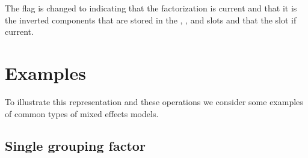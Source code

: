 \documentclass[12pt]{article}
\begin{document}
The  flag is changed to  indicating
that the factorization is current and that it is the inverted
components that are stored in the , , and
 slots and that the  slot if current.


\section{Examples}
\label{sec:Examples}

To illustrate this representation and these operations we consider
some examples of common types of mixed effects models.

\subsection{Single grouping factor}
\label{sec:SingleGrouping}
\end{document}
